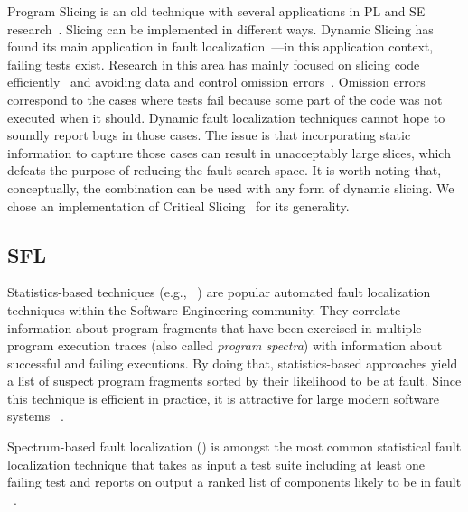 \documentclass{article}
\begin{document}
Program Slicing is an old technique with several applications in PL
and SE research~\cite{Weiser:1981:PS:800078.802557}. Slicing can be
implemented in different ways. Dynamic Slicing has found its main
application in fault
localization~\cite{Agrawal:1990:DPS:93542.93576}---in this application
context, failing tests exist. Research in this area has mainly focused
on slicing code
efficiently~\cite{Wang:2008:DSJ:1330017.1330021,Wang:2004:UCB:998675.999455}
and avoiding data and control omission
errors~\cite{Zhang:2007:TLE:1250734.1250782,Lin:2018:BDE:3238147.3238163}. Omission errors correspond to the
cases where tests fail because some part of the code was not executed
when it should. Dynamic fault localization techniques cannot hope to
soundly report bugs in those cases. The issue is that incorporating
static information to capture those cases can result in unacceptably
large slices, which defeats the purpose of reducing the fault search
space. It is worth noting that, conceptually, the \comb{} combination
can be used with any form of dynamic slicing. We chose an
implementation of Critical
Slicing~\cite{DeMillo:1996:CSS:229000.226310} for its generality.



\subsection{SFL}

Statistics-based techniques (e.g., ~\cite{Pearson:2017:EIF:3097368.3097441}) are
popular automated fault localization techniques within the Software Engineering
community. They correlate information about program fragments that have been
exercised in multiple program execution traces (also called \textit{program
spectra}) with information about successful and failing executions. By doing
that, statistics-based approaches yield a list of suspect program fragments
sorted by their likelihood to be at fault. Since this technique is efficient in
practice, it is attractive for large modern software systems ~\cite{Zoeteweij:2007:DES:1251988.1253298}.

Spectrum-based fault localization (\sfl) is amongst the most common statistical
fault localization technique that takes as input a test suite including at least
one failing test and reports on output a ranked list of components likely to be
in fault ~\cite{FLSurvey2016,DBLP:conf/kbse/JonesH05,DBLP:journals/smr/LuciaLJTB14,DBLP:journals/jss/AbreuZGG09}.

\subsection{\comb{}}
\end{document}

